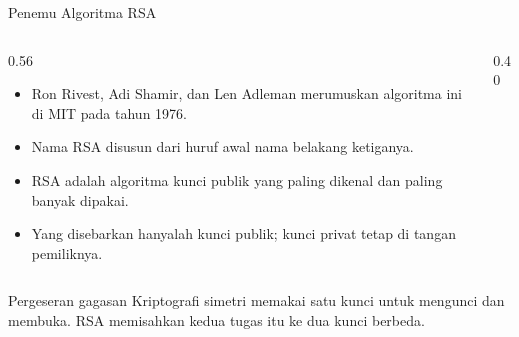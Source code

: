\documentclass[aspectratio=169,11pt]{beamer}
\begin{document}
\begin{frame}{Penemu Algoritma RSA}
    \begin{columns}[T,onlytextwidth]
        \begin{column}{0.56\textwidth}
            \footnotesize
            \begin{itemize}
                \item Ron Rivest, Adi Shamir, dan Len Adleman merumuskan
                      algoritma ini di MIT pada tahun 1976.
                \item Nama RSA disusun dari huruf awal nama belakang
                      ketiganya.
                \item RSA adalah algoritma kunci publik yang paling dikenal
                      dan paling banyak dipakai.
                \item Yang disebarkan hanyalah kunci publik; kunci privat
                      tetap di tangan pemiliknya.
            \end{itemize}
        \end{column}
        \begin{column}{0.40\textwidth}
            \centering
        \end{column}
    \end{columns}
    \vspace{0.1cm}
    \begin{exampleblock}{Pergeseran gagasan}
        \footnotesize
        Kriptografi simetri memakai satu kunci untuk mengunci dan membuka.
        RSA memisahkan kedua tugas itu ke dua kunci berbeda.
    \end{exampleblock}
\end{frame}
\end{document}
